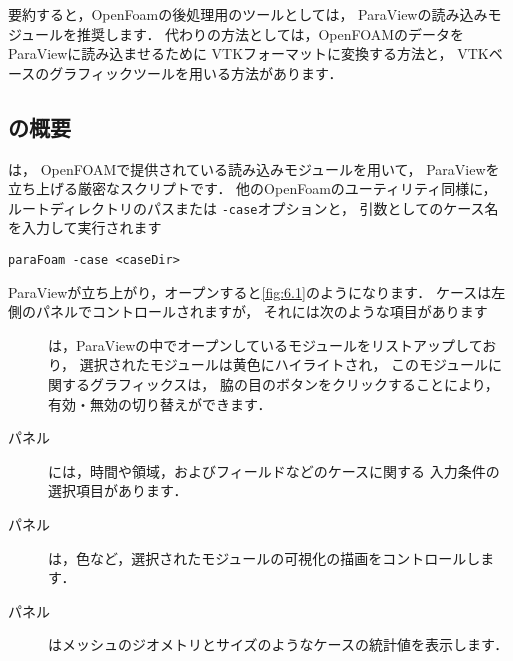 要約すると，OpenFoamの後処理用のツールとしては，
ParaViewの読み込みモジュールを推奨します．
代わりの方法としては，OpenFOAMのデータをParaViewに読み込ませるために
VTKフォーマットに変換する方法と，
VTKベースのグラフィックツールを用いる方法があります．


\subsection{の概要}
\label{ssec:6.1.1}
は，
OpenFOAMで提供されている読み込みモジュールを用いて，
ParaViewを立ち上げる厳密なスクリプトです．
他のOpenFoamのユーティリティ同様に，
ルートディレクトリのパスまたは \texttt{-case}オプションと，
引数としてのケース名を入力して実行されます
\begin{OFterminal}
\begin{verbatim}
paraFoam -case <caseDir>
\end{verbatim}
\end{OFterminal}
ParaViewが立ち上がり，オープンすると\autoref{fig:6.1}のようになります．
ケースは左側のパネルでコントロールされますが，
それには次のような項目があります
\begin{description}
 \item[]
%
%
            は，ParaViewの中でオープンしているモジュールをリストアップしており，
            選択されたモジュールは黄色にハイライトされ，
            このモジュールに関するグラフィックスは，
            脇の目のボタンをクリックすることにより，
            有効・無効の切り替えができます．
 \item[パネル]
%
%
            には，時間や領域，およびフィールドなどのケースに関する
            入力条件の選択項目があります．
 \item[パネル]
%
%
            は，色など，選択されたモジュールの可視化の描画をコントロールします．
 \item[パネル]
%
%
            はメッシュのジオメトリとサイズのようなケースの統計値を表示します．
\end{description}


